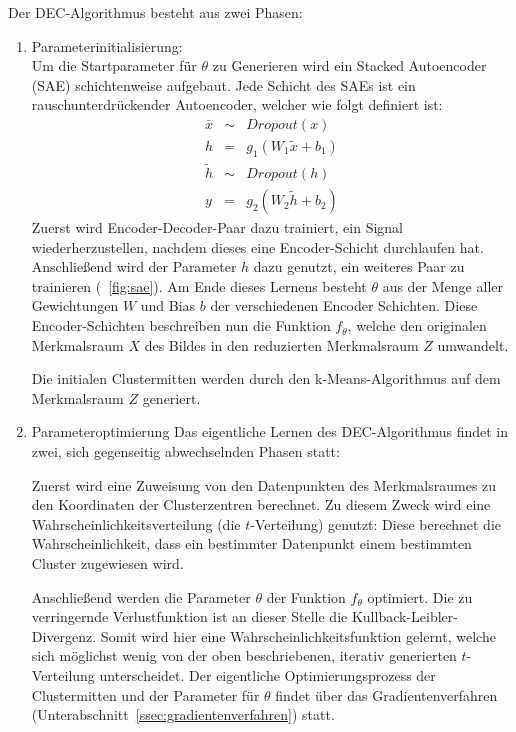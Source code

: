 Der DEC-Algorithmus besteht aus zwei Phasen:
\begin{enumerate}
	\item Parameterinitialisierung:\\
	Um die Startparameter für $\theta$ zu Generieren wird ein Stacked Autoencoder (SAE) schichtenweise aufgebaut. Jede Schicht des SAEs ist ein rauschunterdrückender Autoencoder, welcher wie folgt definiert ist: \cite{junyuan_16}
	\begin{eqnarray}
	\bar{x}&\sim&Dropout(x)\\
	h &=& g_1(W_1\tilde{x}+b_1)\\
	\tilde{h} &\sim& Dropout(h)\\
	y &=& g_2(W_2\tilde{h}+b_2)
	\end{eqnarray}
	Zuerst wird Encoder-Decoder-Paar dazu trainiert, ein Signal wiederherzustellen, nachdem dieses eine Encoder-Schicht durchlaufen hat. Anschließend wird der Parameter $h$ dazu genutzt, ein weiteres Paar zu trainieren (\vgl \figurename~\ref{fig:sae}). Am Ende dieses Lernens besteht $\theta$ aus der Menge aller Gewichtungen $W$ und Bias $b$ der verschiedenen Encoder Schichten. Diese Encoder-Schichten beschreiben nun die Funktion $f_\theta$, welche den originalen Merkmalsraum $X$ des Bildes in den reduzierten Merkmalsraum $Z$ umwandelt.
	
	Die initialen Clustermitten werden durch den k-Means-Algorithmus auf dem Merkmalsraum $Z$ generiert.
	
	\item Parameteroptimierung
	Das eigentliche Lernen des DEC-Algorithmus findet in zwei, sich gegenseitig abwechselnden Phasen statt:
	
	Zuerst wird eine Zuweisung von den Datenpunkten des Merkmalsraumes zu den Koordinaten der Clusterzentren berechnet. Zu diesem Zweck wird eine Wahrscheinlichkeitsverteilung (die $t$-Verteilung) genutzt: Diese berechnet die Wahrscheinlichkeit, dass ein bestimmter Datenpunkt einem bestimmten Cluster zugewiesen wird.
	
	Anschließend werden die Parameter $\theta$ der Funktion $f_\theta$ optimiert. Die zu verringernde Verlustfunktion ist an dieser Stelle die Kullback-Leibler-Divergenz. Somit wird hier eine Wahrscheinlichkeitsfunktion gelernt, welche sich möglichst wenig von der oben beschriebenen, iterativ generierten $t$-Verteilung unterscheidet. Der eigentliche Optimierungsprozess der Clustermitten und der Parameter für $\theta$ findet über das Gradientenverfahren (\vgl Unterabschnitt~\ref{ssec:gradientenverfahren}) statt.
\end{enumerate}

